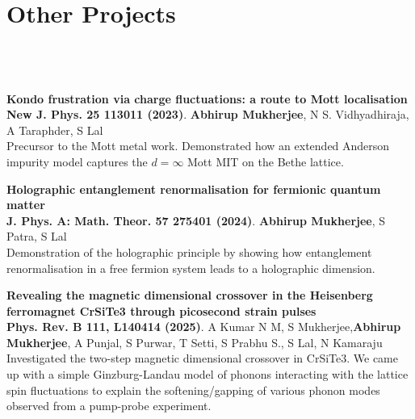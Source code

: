 \documentclass[10pt,aspectratio=169]{beamer}
\newcommand\focus[1]{%
	{\alert{\textbf{#1}}}
}
\begin{document}
\section{\Large Other Projects}
\subsection{~}
\begin{frame}{}
\focus{Kondo frustration via charge fluctuations: a route to Mott localisation}\\
{\bf New J. Phys. 25 113011 (2023)}. {\bf Abhirup Mukherjee}, N S. Vidhyadhiraja, A Taraphder, S Lal\\
Precursor to the Mott metal work. Demonstrated how an extended Anderson impurity model captures the \(d=\infty\) Mott MIT on the Bethe lattice.
\vfill

\focus{Holographic entanglement renormalisation for fermionic quantum matter}\\
{\bf J. Phys. A: Math. Theor. 57 275401 (2024)}. {\bf Abhirup Mukherjee}, S Patra, S Lal\\
Demonstration of the holographic principle by showing how entanglement renormalisation in a free fermion system leads to a holographic dimension.
\vfill

\focus{Revealing the magnetic dimensional crossover in the Heisenberg ferromagnet CrSiTe3 through picosecond strain pulses}\\
{\bf Phys. Rev. B 111, L140414 (2025)}. A Kumar N M, S Mukherjee,{\bf Abhirup Mukherjee}, A Punjal, S Purwar, T Setti, S Prabhu S., S Lal, N Kamaraju\\
Investigated the two-step magnetic dimensional crossover in CrSiTe3. We came up with a simple Ginzburg-Landau model of phonons interacting with the lattice spin fluctuations to explain the softening/gapping of various phonon modes observed from a pump-probe experiment.
\end{frame}
\end{document}
